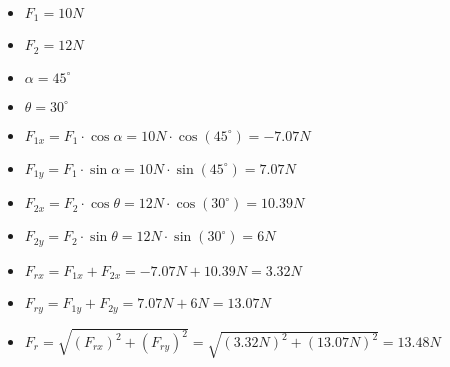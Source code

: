 \documentclass[../practica_01.tex]{subfiles}
\begin{document}
\begin{itemize}
    \item $F_1=10N$
    \item $F_2=12N$
    \item $\alpha = 45^\circ$
    \item $\theta = 30^\circ$
    \item $F_{1x}= F_1 \cdot \cos \alpha = 10N \cdot \cos(45^\circ) = -7.07N$
    \item $F_{1y}= F_1 \cdot \sin \alpha = 10N \cdot \sin(45^\circ) = 7.07N$
    \item $F_{2x}= F_2 \cdot \cos \theta = 12N \cdot \cos(30^\circ) = 10.39N$
    \item $F_{2y}= F_2 \cdot \sin \theta = 12N \cdot \sin(30^\circ) = 6N$
    \item $F_{rx}= F_{1x} + F_{2x} = -7.07N + 10.39N = 3.32N$
    \item $F_{ry}= F_{1y} + F_{2y} = 7.07N + 6N = 13.07N$
    \item $F_{r}= \sqrt{(F_{rx})^2 + (F_{ry})^2} = \sqrt{(3.32N)^2+(13.07N)^2} = 13.48N$ 
\end{itemize}
\end{document}
